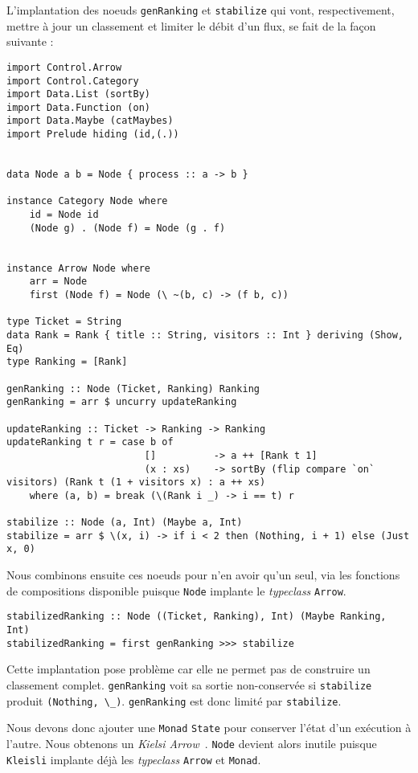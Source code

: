 \documentclass{llncs}
\newcommand{\Arr}{\lstinline{Arrow} }
\newcommand{\Arrp}{\lstinline{Arrow}. }
\begin{document}
L'implantation des noeuds \lstinline{genRanking} et \lstinline{stabilize} qui vont,
respectivement, mettre à jour un classement et limiter le débit d'un flux,
se fait de la façon suivante :
\begin{lstlisting}
import Control.Arrow
import Control.Category
import Data.List (sortBy)
import Data.Function (on)
import Data.Maybe (catMaybes)
import Prelude hiding (id,(.))


data Node a b = Node { process :: a -> b }

instance Category Node where
    id = Node id
    (Node g) . (Node f) = Node (g . f)


instance Arrow Node where
    arr = Node
    first (Node f) = Node (\ ~(b, c) -> (f b, c))

type Ticket = String
data Rank = Rank { title :: String, visitors :: Int } deriving (Show, Eq)
type Ranking = [Rank]

genRanking :: Node (Ticket, Ranking) Ranking
genRanking = arr $ uncurry updateRanking

updateRanking :: Ticket -> Ranking -> Ranking
updateRanking t r = case b of
                        []          -> a ++ [Rank t 1]
                        (x : xs)    -> sortBy (flip compare `on` visitors) (Rank t (1 + visitors x) : a ++ xs)
    where (a, b) = break (\(Rank i _) -> i == t) r

stabilize :: Node (a, Int) (Maybe a, Int)
stabilize = arr $ \(x, i) -> if i < 2 then (Nothing, i + 1) else (Just x, 0)
\end{lstlisting}

Nous combinons ensuite ces noeuds pour n'en avoir qu'un seul, via les fonctions
de compositions disponible puisque \lstinline{Node} implante le \emph{typeclass} \Arrp
\begin{lstlisting}
stabilizedRanking :: Node ((Ticket, Ranking), Int) (Maybe Ranking, Int)
stabilizedRanking = first genRanking >>> stabilize
\end{lstlisting}

Cette implantation pose problème car elle ne permet pas de construire un classement
complet. \lstinline{genRanking} voit sa sortie non-conservée si \lstinline{stabilize}
produit \lstinline{(Nothing, \_)}.
\lstinline{genRanking} est donc limité par \lstinline{stabilize}.

Nous devons donc ajouter une \lstinline{Monad} \lstinline{State} pour conserver l'état d'un exécution à l'autre.
Nous obtenons un \emph{Kielsi Arrow}~\cite{Hughes00}.
\lstinline{Node} devient alors inutile puisque \lstinline{Kleisli} implante déjà les
\emph{typeclass} \Arr et \lstinline{Monad}.
\end{document}
